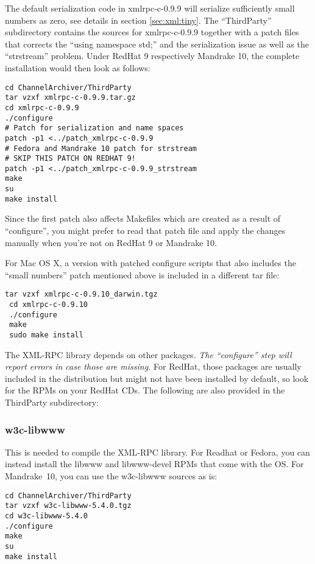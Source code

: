 \NOTE The default serialization code in xmlrpc-c-0.9.9 will serialize
sufficiently small numbers as zero, see details in section \ref{sec:xml:tiny}.
The ``ThirdParty'' subdirectory contains the sources for xmlrpc-c-0.9.9
together with a patch files that corrects the ``using namespace std;'' and
the serialization issue as well as the ``strstream'' problem.
Under RedHat 9 respectively Mandrake 10, the complete installation would
then look as follows:

\begin{lstlisting}[keywordstyle=\sffamily]
cd ChannelArchiver/ThirdParty
tar vzxf xmlrpc-c-0.9.9.tar.gz
cd xmlrpc-c-0.9.9
./configure
# Patch for serialization and name spaces
patch -p1 <../patch_xmlrpc-c-0.9.9
# Fedora and Mandrake 10 patch for strstream
# SKIP THIS PATCH ON REDHAT 9!
patch -p1 <../patch_xmlrpc-c-0.9.9_strstream
make
su
make install
\end{lstlisting}

\noindent Since the first patch also affects Makefiles which are
created as a result of ``configure'', you might prefer to read that
patch file and apply the changes manually when you're not on RedHat 9
or Mandrake 10.

For Mac OS X, a version with patched configure scripts
\cite{darwinports} that also includes the ``small numbers'' patch
mentioned above is included in a different tar file:
\begin{lstlisting}[keywordstyle=\sffamily]
 tar vzxf xmlrpc-c-0.9.10_darwin.tgz
 cd xmlrpc-c-0.9.10
 ./configure 
 make
 sudo make install
\end{lstlisting}

The XML-RPC library depends on other packages. \emph{The ``configure''
step will report errors in case those are missing.} For RedHat, those
packages are usually included in the distribution but might not have
been installed by default, so look for the RPMs on your RedHat CDs.
The following are also provided in the ThirdParty subdirectory:

\subsubsection{w3c-libwww}
This is needed to compile the XML-RPC library.
For Readhat or Fedora, you can instead install the libwww
and libwww-devel RPMs that come with the OS.
For Mandrake~10, you can use the w3c-libwww sources as is:
\begin{lstlisting}[keywordstyle=\sffamily]
cd ChannelArchiver/ThirdParty
tar vzxf w3c-libwww-5.4.0.tgz
cd w3c-libwww-5.4.0
./configure
make
su
make install
\end{lstlisting}

